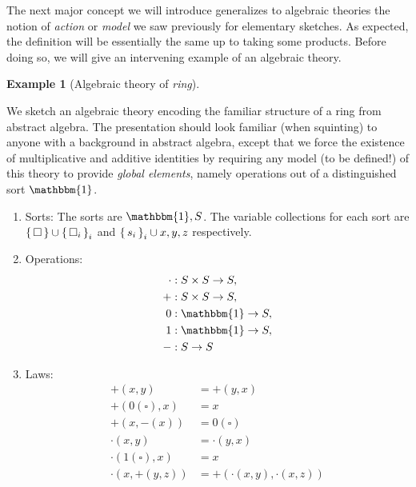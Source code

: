 \documentclass[12pt,twoside]{reedthesis}
\theoremstyle{definition}
\newtheorem{example}{Example}
\theoremstyle{remark}
\theoremstyle{plain}
\begin{document}
The next major concept we will introduce generalizes to algebraic theories the
notion of \emph{action} or \emph{model} we saw previously for elementary
sketches. As expected, the definition will be essentially the same up to taking
some products. Before doing so, we will give an intervening example of an
algebraic theory.
\begin{example}[Algebraic theory of \emph{ring}]\label{ex:theory of ring}

  We sketch an algebraic theory encoding the familiar structure of a ring from
  abstract algebra. The presentation should look familiar (when squinting) to
  anyone with a background in abstract algebra, except that we force the
  existence of multiplicative and additive identities by requiring any model (to
  be defined!) of this theory to provide \emph{global elements}, namely
  operations out of a distinguished sort $\mathbbm{1}$.
  \begin{enumerate}
    \item Sorts: The sorts are \( \mathbbm{1}, S\). The variable collections for
          each sort are \( \set{\square} \cup \set{\square_{i}}_{i} \) and
          \( \set{s_{i}}_{i} \cup {x,y,z} \) respectively.

    \item Operations: \begin{align*}
                        \cdot &: S \times S \rightarrow S, \\
                        + &: S \times S \rightarrow S,\\
                        0 &: \mathbbm{1} \rightarrow S,\\
                        1 &: \mathbbm{1} \rightarrow S,\\
                        - &: S \rightarrow S
                      \end{align*}

    \item Laws: \begin{align*}
                  +(x,y) &= +(y,x)\\
                  +(0(\square), x) &= x\\
                  +(x, -(x)) &= 0(\square)\\
                  \cdot(x,y) &= \cdot(y,x)\\
                  \cdot(1(\square), x) &= x\\
                  \cdot(x, +(y,z)) &= +(\cdot(x,y), \cdot(x,z))
                \end{align*}
  \end{enumerate}
\end{example}
\end{document}
